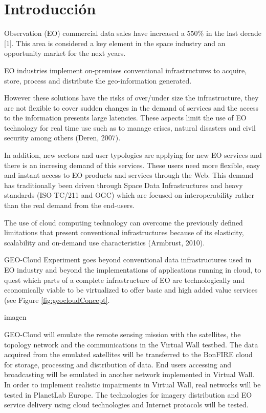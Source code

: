 \chapter{Introducción}

 Observation (EO) commercial data sales have increased a 550\% in
the last decade \cite{sousa}[1]. This area is considered a key element in the
space industry and an opportunity market for the next years. 

EO industries implement on-premises conventional infrastructures to acquire,
store, process and distribute the geo-information generated. 

However these solutions have the risks of over/under size the infrastructure, they are not flexible to cover sudden changes in the demand of services and the access to the information presents large latencies.  These aspects limit the use of EO technology for real time use such as to manage crises, natural disasters and civil security among others (Deren, 2007).

In addition, new sectors and user typologies are applying for new EO services
and there is an incresing demand of this services. These users
need more flexible, easy and instant access to EO products and services through
the Web. This demand has traditionally been driven through Space Data
Infrastructures and heavy standards (ISO TC/211 and OGC) which are focused on
interoperability rather than the real demand from the end-users. 

The use of cloud computing technology can overcome the previously defined limitations that present conventional infrastructures because of its elasticity, scalability and on-demand use characteristics (Armbrust, 2010). 

GEO-Cloud Experiment goes beyond conventional data infrastructures used in EO
industry and beyond the implementations of applications running in cloud, to
quest which parts of a complete infrastructure of EO are technologically and
economically viable to be virtualized to offer basic and high added value
services (see Figure \ref{fig:geocloudConcept}.

imagen
 

GEO-Cloud will emulate the remote sensing mission with the satellites, the
topology network and the communications in the Virtual Wall testbed. The data
acquired from the emulated satellites will be transferred to the BonFIRE cloud
for storage, processing and distribution of data. End users accessing and
broadcasting will be emulated in another network implemented in Virtual Wall. In
order to implement realistic impairments in Virtual Wall, real networks will be
tested in PlanetLab Europe.  The technologies for imagery distribution and EO
service delivery using cloud technologies and Internet protocols will be tested.


